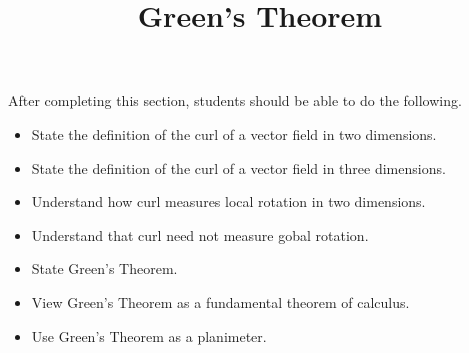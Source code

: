 \documentclass{ximera}
\title{Green's Theorem}
\begin{document}
\begin{abstract}
\end{abstract}
\maketitle

\begin{sectionOutcomes}

After completing this section, students should be able to do the following.

\begin{itemize}
\item State the definition of the curl of a vector field in two dimensions.
\item State the definition of the curl of a vector field in three dimensions.
\item Understand how curl measures local rotation in two dimensions.
\item Understand that curl need not measure gobal rotation.
\item State Green's Theorem.
\item View Green's Theorem as a fundamental theorem of calculus.
\item Use Green's Theorem as a planimeter.
\end{itemize}

\end{sectionOutcomes}
\end{document}
